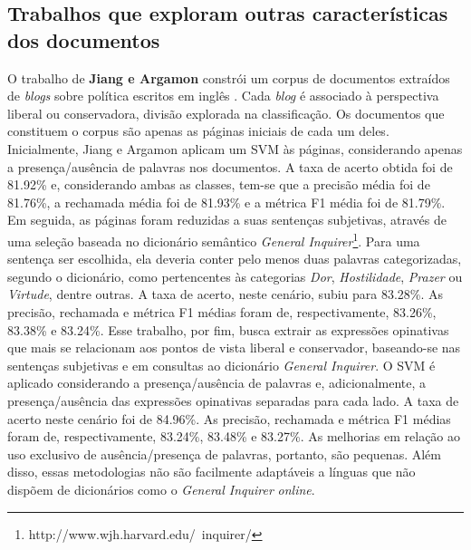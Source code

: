 





\subsection{Trabalhos que exploram outras características dos documentos}
\label{sintaxe}

O trabalho de \textbf{Jiang e Argamon} constrói um corpus de documentos extraídos de \emph{blogs} sobre política escritos em inglês \cite{jiang-argamon}. Cada \emph{blog} é associado à perspectiva liberal ou conservadora, divisão explorada na classificação. Os documentos que constituem o corpus são apenas as páginas iniciais de cada um deles. Inicialmente, Jiang e Argamon aplicam um SVM às páginas, considerando apenas a presença/ausência de palavras nos documentos. A taxa de acerto obtida foi de 81.92\% e, considerando ambas as classes, tem-se que a precisão média foi de 81.76\%, a rechamada média foi de 81.93\% e a métrica F1 média foi de 81.79\%. Em seguida, as páginas foram reduzidas a suas sentenças subjetivas, através de uma seleção baseada no dicionário semântico \emph{General Inquirer}\footnote{http://www.wjh.harvard.edu/~inquirer/}. Para uma sentença ser escolhida, ela deveria conter pelo menos duas palavras categorizadas, segundo o dicionário, como pertencentes às categorias \emph{Dor}, \emph{Hostilidade}, \emph{Prazer} ou \emph{Virtude}, dentre outras. A taxa de acerto, neste cenário, subiu para 83.28\%. As precisão, rechamada e métrica F1 médias foram de, respectivamente, 83.26\%, 83.38\% e 83.24\%. Esse trabalho, por fim, busca extrair as expressões opinativas que mais se relacionam aos pontos de vista liberal e conservador, baseando-se nas sentenças subjetivas e em consultas ao dicionário \emph{General Inquirer}. O SVM é aplicado considerando a presença/ausência de palavras e, adicionalmente, a presença/ausência das expressões opinativas separadas para cada lado. A taxa de acerto neste cenário foi de 84.96\%. As precisão, rechamada e métrica F1 médias foram de, respectivamente, 83.24\%, 83.48\% e 83.27\%. As melhorias em relação ao uso exclusivo de ausência/presença de palavras, portanto, são pequenas. Além disso, essas metodologias não são facilmente adaptáveis a línguas que não dispõem de dicionários como o \emph{General Inquirer} \emph{online}.

